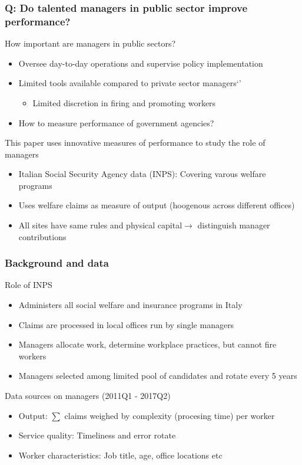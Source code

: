 \documentclass[aspectratio=169]{beamer}
\begin{document}
\begin{frame}
\frametitle{Q: Do talented managers in public sector improve performance?} 
How important are managers in public sectors?
\begin{itemize}\setlength\itemsep{3pt}
\item Oversee day-to-day operations and supervise policy implementation 
\item Limited tools available compared to private sector managers`'
\begin{itemize}
\item Limited discretion in firing and promoting workers
\end{itemize}
\item How to measure performance of government agencies?
\end{itemize}\medskip
This paper uses innovative measures of performance to study the role of managers
\begin{itemize}\setlength\itemsep{3pt}
\item Italian Social Security Agency data (INPS): Covering varous welfare programs
\item Uses welfare claims as measure of output (hoogenous across different offices)
\item All sites have same rules and physical capital$\to$ distinguish manager contributions
\end{itemize}\medskip
\end{frame}

\begin{frame}
\frametitle{Background and data} 
Role of INPS 
\begin{itemize}\setlength\itemsep{3pt}
\item Administers all social welfare and insurance programs in Italy 
\item Claims are processed in local offices run by single managers 
\item Managers allocate work, determine workplace practices, but cannot fire workers
\item Managers selected among limited pool of candidates and rotate every 5 years 
\end{itemize}\medskip
Data sources on managers (2011Q1 - 2017Q2)
\begin{itemize}\setlength\itemsep{3pt}
\item Output: $\sum$ claims weighed by complexity (procesing time) per worker
\item Service quality: Timeliness and error rotate
\item Worker characteristics: Job title, age, office locations etc
\end{itemize}
\end{frame}
\end{document}
